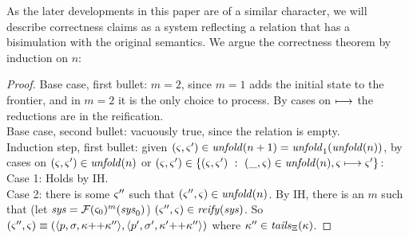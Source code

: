 As the later developments in this paper are of a similar character, we will describe correctness claims as a system reflecting a relation that has a bisimulation with the original semantics.
%
We argue the correctness theorem by induction on $n$:
\begin{proof}
  Base case, first bullet: $m = 2$, since $m = 1$ adds the initial state to the frontier, and in $m = 2$ it is the only choice to process. By cases on $\longmapsto$ the reductions are in the reification. \\
  Base case, second bullet: vacuously true, since the relation is empty. \\
  Induction step, first bullet: 
given $(\varsigma,\varsigma') \in \mathit{unfold}(n+1) = \mathit{unfold}_1(\mathit{unfold}(n))$,
by cases on $(\varsigma,\varsigma') \in \mathit{unfold}(n)$ or $(\varsigma,\varsigma') \in \{ (\varsigma,\varsigma')\ :\ (\_,\varsigma) \in \mathit{unfold}(n), \varsigma \longmapsto \varsigma'\}$:
\\
Case 1: Holds by IH.
\\
Case 2: there is some $\varsigma''$ such that $(\varsigma'',\varsigma) \in \mathit{unfold}(n)$.
        By IH, there is an $m$ such that (let $\mathit{sys} = {\mathcal F}(\varsigma_0)^m(\mathit{sys}_0)$) $(\varsigma'',\varsigma) \in \mathit{reify}(\mathit{sys})$.
        So $(\varsigma'',\varsigma) \equiv (\langle p, \sigma, \kappa {\tt ++} \kappa'' \rangle,\langle p',\sigma',\kappa' {\tt ++} \kappa'' \rangle)$ where $\kappa'' \in \mathit{tails}_{\Xi}(\kappa)$.


\end{proof}
